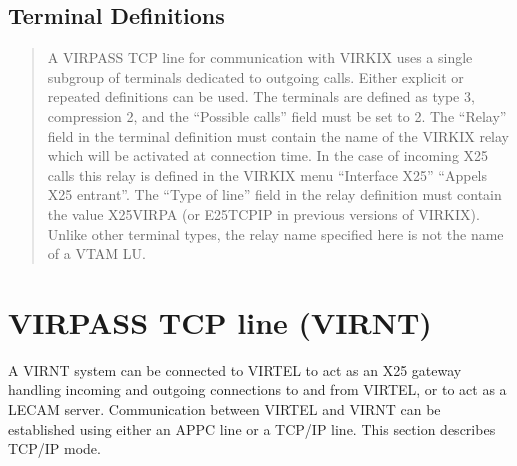\documentclass[letterpaper,10pt,english]{sphinxmanual}
\begin{document}
\subsection{Terminal Definitions}
\label{\detokenize{connectivity_guide:index-44}}\label{\detokenize{connectivity_guide:id17}}\begin{quote}

\sphinxAtStartPar
A VIRPASS TCP line for communication with VIRKIX uses a single sub\sphinxhyphen{}group of terminals dedicated to outgoing calls. Either explicit or repeated definitions can be used. The terminals are defined as type 3, compression 2, and the “Possible calls” field must be set to 2. The “Relay” field in the terminal definition must contain the name of the VIRKIX relay which will be activated at connection time. In the case of incoming X25 calls this relay is defined in the VIRKIX menu “Interface X25” \textendash{} “Appels X25 entrant”. The “Type of
line” field in the relay definition must contain the value X25VIRPA (or E25TCPIP in previous versions of VIRKIX). Unlike other terminal types, the relay name specified here is not the name of a VTAM LU.
\end{quote}

\sphinxAtStartPar
{}

\newpage

\ignorespaces 

\section{VIRPASS TCP line (VIRNT)}
\label{\detokenize{connectivity_guide:virpass-tcp-line-virnt}}\label{\detokenize{connectivity_guide:index-45}}
\sphinxAtStartPar
A VIRNT system can be connected to VIRTEL to act as an X25 gateway handling incoming and outgoing connections to and from VIRTEL, or to act as a LECAM server. Communication between VIRTEL and VIRNT can be established using either an APPC line or a TCP/IP line. This section describes TCP/IP mode.

\sphinxAtStartPar
{}

\ignorespaces 
\end{document}
